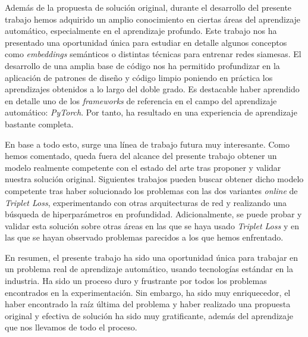 Además de la propuesta de solución original, durante el desarrollo del presente trabajo hemos adquirido un amplio conocimiento en ciertas áreas del aprendizaje automático, especialmente en el aprendizaje profundo. Este trabajo nos ha presentado una oportunidad única para estudiar en detalle algunos conceptos como \textit{embeddings} semánticos o distintas técnicas para entrenar redes siamesas. El desarrollo de una amplia base de código nos ha permitido profundizar en la aplicación de patrones de diseño y código limpio poniendo en práctica los aprendizajes obtenidos a lo largo del doble grado. Es destacable haber aprendido en detalle uno de los \textit{frameworks} de referencia en el campo del aprendizaje automático: \textit{PyTorch}. Por tanto, ha resultado en una experiencia de aprendizaje bastante completa.

En base a todo esto, surge una línea de trabajo futura muy interesante. Como hemos comentado, queda fuera del alcance del presente trabajo obtener un modelo realmente competente con el estado del arte tras proponer y validar nuestra solución original. Siguientes trabajos pueden buscar obtener dicho modelo competente tras haber solucionado los problemas con las dos variantes \textit{online} de \textit{Triplet Loss}, experimentando con otras arquitecturas de red y realizando una búsqueda de hiperparámetros en profundidad.
Adicionalmente, se puede probar y validar esta solución sobre otras áreas en las que se haya usado \textit{Triplet Loss} y en las que se hayan observado problemas parecidos a los que hemos enfrentado.

En resumen, el presente trabajo ha sido una oportunidad única para trabajar en un problema real de aprendizaje automático, usando tecnologías estándar en la industria. Ha sido un proceso duro y frustrante por todos los problemas encontrados en la experimentación. Sin embargo, ha sido muy enriquecedor, el haber encontrado la raíz última del problema y haber realizado una propuesta original y efectiva de solución ha sido muy gratificante, además del aprendizaje que nos llevamos de todo el proceso.
